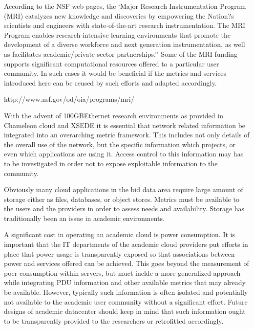 \documentclass{sig-alternate-05-2015}
\begin{document}
\begin{description}
\setlength\itemsep{-2pt}

\item[\it MRIs.] According to the NSF web pages, the `Major Research
  Instrumentation Program (MRI) catalyzes new knowledge and
  discoveries by empowering the Nation?s scientists and engineers with
  state-of-the-art research instrumentation. The MRI Program enables
  research-intensive learning environments that promote the
  development of a diverse workforce and next generation
  instrumentation, as well as facilitates academic/private sector
  partnerships.'' Some of the MRI funding supports significant
  computational resources offered to a particular user community. In
  such cases it would be beneficial if the metrics and services
  introduced here can be reused by such efforts and adapted
  accordingly. 

http://www.nsf.gov/od/oia/programs/mri/~\cite{nsf-mri}

\item[\it Networks.] With the advent of 100GBEthernet research
  environments as provided in Chameleon cloud and XSEDE it is
  essential that network related information be integrated into an
  overarching metric framework. This includes not only details of the
  overall use of the network, but the specific information which
  projects, or even which applications are using it. Access control to
  this information may has to be investigated in order not to expose
  exploitable information to the community.

\item[\it Storage.] Obviously many cloud applications in the bid data
  area require large amount of storage either as files, databases, or
  object stores. Metrics must be available to the users and the
  providers in order to assess needs and availability. Storage has
  traditionally been an issue in academic environments.

\item[\it Power.] A significant cost in operating an academic cloud is
  power consumption. It is important that the IT departments of the
  academic cloud providers put efforts in place that power usage is
  transparently exposed so that associations between power and
  services offered can be achieved. This goes beyond the measurement
  of poer consumption within servers, but muct inclde a more
  generalized approach while integrating PDU information and other
  available metrics that may already be available. However, typically
  such information is often isolated and potentially not available to
  the academic user community without a significant effort. Future
  designs of academic datacenter should keep in mind that such
  information ought to be transparently provided to the researchers or
  retrofitted accordingly.


\end{description}
\end{document}
